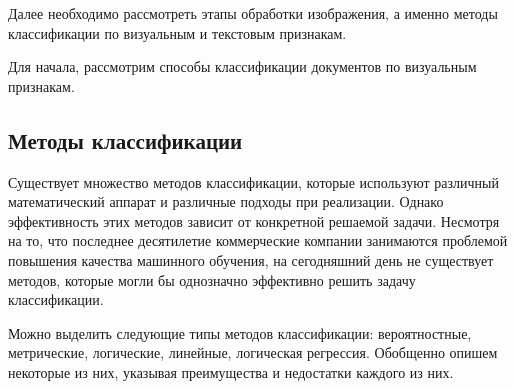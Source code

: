 Далее необходимо рассмотреть этапы обработки изображения, а именно методы классификации по визуальным и текстовым признакам.

Для начала, рассмотрим способы классификации документов по визуальным признакам.

\subsection{Методы классификации}

Существует множество методов классификации, которые используют различный математический аппарат и различные подходы при реализации. Однако эффективность этих методов зависит от конкретной решаемой задачи. Несмотря на то, что последнее десятилетие коммерческие компании занимаются проблемой повышения качества машинного обучения, на сегодняшний день не существует методов, которые могли бы однозначно эффективно решить задачу классификации. 

Можно выделить следующие типы методов классификации: вероятностные, метрические, логические, линейные, логическая регрессия. Обобщенно опишем некоторые из них, указывая преимущества и недостатки каждого из них. 

